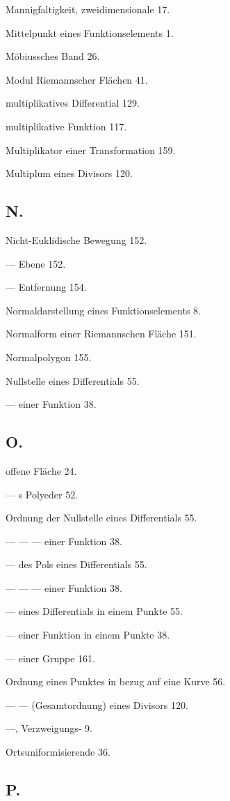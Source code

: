 \documentclass{article}
\begin{document}
Mannigfaltigkeit, zweidimensionale 17.

Mittelpunkt eines Funktionselements 1.

Möbiussches Band 26.

Modul Riemannscher Flächen 41.

multiplikatives Differential 129.

multiplikative Funktion 117.

Multiplikator einer Transformation 159.

Multiplum eines Divisors 120.

\subsection*{N.}

Nicht-Euklidische Bewegung 152.

--- Ebene 152.

--- Entfernung 154.

Normaldarstellung eines Funktionselements 8.

Normalform einer Riemannschen Fläche 151.

Normalpolygon 155.

Nullstelle eines Differentials 55.

--- einer Funktion 38.

\subsection*{O.}

offene Fläche 24.

--- s Polyeder 52.

Ordnung der Nullstelle eines Differentials 55.

--- --- --- einer Funktion 38.

--- des Pols eines Differentials 55.

--- --- --- einer Funktion 38.

--- eines Differentials in einem Punkte 55.

--- einer Funktion in einem Punkte 38.

--- einer Gruppe 161.

Ordnung eines Punktes in bezug auf eine Kurve 56.

--- --- (Gesamtordnung) eines Divisors 120.

---, Verzweigungs- 9.

Ortsuniformisierende 36.

\subsection*{P.}
\end{document}
